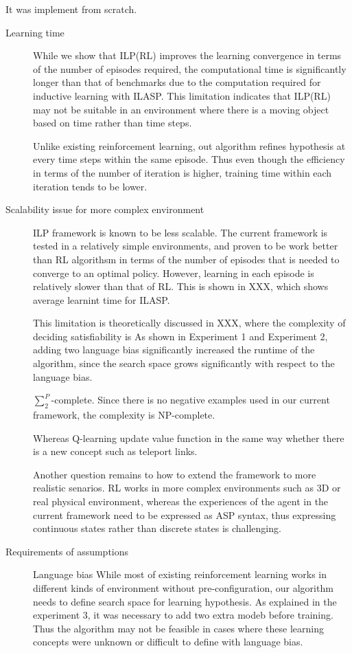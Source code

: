 It was implement from scratch.

\begin{description}
\item[Learning time]
While we show that ILP(RL) improves the learning convergence in terms of the number of episodes required, the computational time is significantly longer than that of benchmarks due to the computation required for inductive learning with ILASP.
This limitation indicates that ILP(RL) may not be suitable in an environment where there is a moving object based on time rather than time steps.

Unlike existing reinforcement learning,
out algorithm refines hypothesis at every time steps within the same episode.
Thus even though the efficiency in terms of the number of iteration is higher,
training time within each iteration tends to be lower.

\item[Scalability issue for more complex environment]
ILP framework is known to be less scalable. The current framework is tested in a relatively simple environments, 
and proven to be work better than RL algorithsm in terms of the number of episodes that is needed to converge to an optimal policy.
However, learning in each episode is relatively slower than that of RL. 
This is shown in XXX, which shows average learnint time for ILASP. 

This limitation is theoretically discussed in XXX, where the complexity of deciding satisfiability is 
As shown in Experiment 1 and Experiment 2, adding two language bias significantly increased the runtime of the algorithm, since the search space grows significantly with respect to the language bias.

$\sum_{2}^{P}$-complete. Since there is no negative examples used in our current framework, the complexity is NP-complete.

Whereas Q-learning update value function in the same way whether there is a new concept such as teleport links.

Another question remains to how to extend the framework to more realistic senarios. RL works in more complex environments such as 3D or real physical environment, 
whereas the experiences of the agent in the current framework need to be expressed as ASP syntax, thus expressing continuous states rather than discrete states is challenging.

\item[Requirements of assumptions]

Language bias
While most of existing reinforcement learning works in different kinds of environment without pre-configuration, our algorithm
needs to define search space for learning hypothesis. As explained in the experiment 3, it was necessary to add two extra modeb before training.
Thus the algorithm may not be feasible in cases where these learning concepts were unknown or difficult to define with language bias. 


\end{description}
